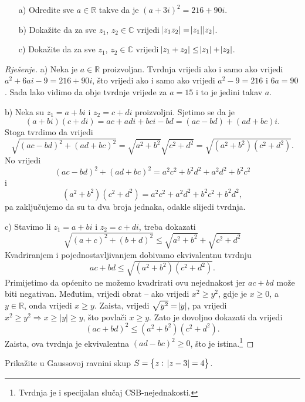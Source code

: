 \begin{exercise}\textbf{}
\begin{itemize}
\item[a)] Odredite sve $a\in \mathbb{R}$ takve da je $(a+3i)^2=216+90i$.
\item[b)] Dokažite da za sve $z_1$, $z_2\in \mathbb{C}$ vrijedi $\abs{z_1z_2}=\abs{z_1}\abs{z_2}$.
\item[c)] Dokažite da za sve $z_1$, $z_2\in \mathbb{C}$ vrijedi $\abs{z_1+z_2}\leq \abs{z_1}+\abs{z_2}$.
\end{itemize}
\end{exercise}
\begin{proof}[Rješenje]
a) Neka je $a\in \mathbb{R}$ proizvoljan. Tvrdnja vrijedi ako i samo ako vrijedi $a^2+6ai-9=216+90i$, što vrijedi ako i samo ako vrijedi $a^2-9=216$ i $6a=90$. Sada lako vidimo da obje tvrdnje vrijede za $a=15$ i to je jedini takav $a$.

b) Neka su $z_1=a+bi$ i $z_2=c+di$ proizvoljni. Sjetimo se da je $$(a+bi)(c+di)=ac+adi+bci-bd=(ac-bd)+(ad+bc)i.$$ Stoga tvrdimo da vrijedi
$$\sqrt{(ac-bd)^2+(ad+bc)^2}=\sqrt{a^2+b^2}\sqrt{c^2+d^2}=\sqrt{(a^2+b^2)(c^2+d^2)}.$$
No vrijedi $$(ac-bd)^2+(ad+bc)^2=a^2c^2+b^2d^2+a^2d^2+b^2c^2$$ 
i 
$$(a^2+b^2)(c^2+d^2)=a^2c^2+a^2d^2+b^2c^2+b^2d^2,$$ pa zaključujemo da su ta dva broja jednaka, odakle slijedi tvrdnja.

c) Stavimo li $z_1=a+bi$ i $z_2=c+di$, treba dokazati
$$\sqrt{(a+c)^2+(b+d)^2}\leq \sqrt{a^2+b^2}+\sqrt{c^2+d^2}$$
Kvadriranjem i pojednostavljivanjem dobivamo ekvivalentnu tvrdnju
$$ac+bd\leq \sqrt{(a^2+b^2)(c^2+d^2)}.$$
Primijetimo da općenito ne možemo kvadrirati ovu nejednakost jer $ac+bd$ može biti negativan. Međutim, vrijedi obrat -- ako vrijedi $x^2\geq y^2$, gdje je $x\geq 0$, a $y\in \mathbb{R}$, onda vrijedi $x\geq y$. Zaista, vrijedi $\sqrt{y^2}=\abs{y}$, pa vrijedi $x^2\geq y^2\Rightarrow x\geq |y|\geq y$, što povlači $x\geq y$. Zato je dovoljno dokazati da vrijedi
$$(ac+bd)^2\leq (a^2+b^2)(c^2+d^2).$$
Zaista, ova tvrdnja je ekvivalentna $(ad-bc)^2\geq 0$, što je istina.\footnote{Tvrdnja je i specijalan slučaj CSB-nejednakosti.}
\end{proof}
\begin{exercise}
Prikažite u Gaussovoj ravnini skup $S=\left\{z :\; \abs{z-3}=4\right\}$.
\end{exercise}
